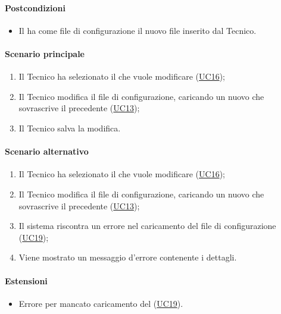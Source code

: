 \paragraph*{Postcondizioni}
\begin{itemize}
  \item Il  ha come file di configurazione il nuovo file inserito dal Tecnico.
\end{itemize}

\paragraph*{Scenario principale}
\begin{enumerate}
  \item Il Tecnico ha selezionato il  che vuole modificare (\hyperref[UC16]{UC16});
  \item Il Tecnico modifica il file di configurazione, caricando un nuovo  che sovrascrive il precedente (\hyperref[UC13]{UC13});
  \item Il Tecnico salva la modifica.
\end{enumerate}

\paragraph*{Scenario alternativo}
\begin{enumerate}
  \item Il Tecnico ha selezionato il  che vuole modificare (\hyperref[UC16]{UC16});
  \item Il Tecnico modifica il file di configurazione, caricando un nuovo  che sovrascrive il precedente (\hyperref[UC13]{UC13});
  \item Il sistema riscontra un errore nel caricamento del file di configurazione (\hyperref[UC19]{UC19});
  \item Viene mostrato un messaggio d'errore contenente i dettagli.
\end{enumerate}

\paragraph*{Estensioni}
\begin{itemize}
  \item Errore per mancato caricamento del  (\hyperref[UC19]{UC19}).
\end{itemize}